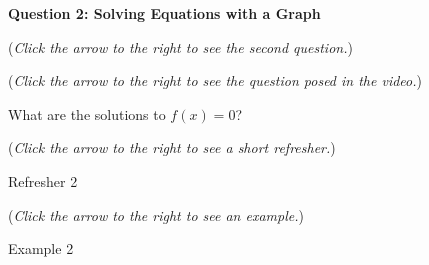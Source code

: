 \documentclass{ximera}
\begin{document}
\textbf{Question 2: Solving Equations with a Graph}
\begin{question}
\begin{flushright}
{\color{blue}(\emph{Click the arrow to the right to see the second question.})}
\end{flushright}
\begin{center}
\begin{expandable}
{\color{blue}(\emph{Click the arrow to the right to see the  question
posed in the video.})}
\begin{expandable}
What are the solutions to $f(x)=0$?
\begin{multipleChoice}
\end{multipleChoice}
\begin{flushright}
{\color{blue}(\emph{Click the arrow to the right to see a short refresher.})}
\end{flushright}
\begin{expandable}
Refresher 2
\end{expandable}
\begin{flushright}
{\color{blue}(\emph{Click the arrow to the right to see an example.})}
\end{flushright}
\begin{expandable}
Example 2
\end{expandable}
\end{expandable}
\end{expandable}
\end{center}
\end{question}
\end{document}
